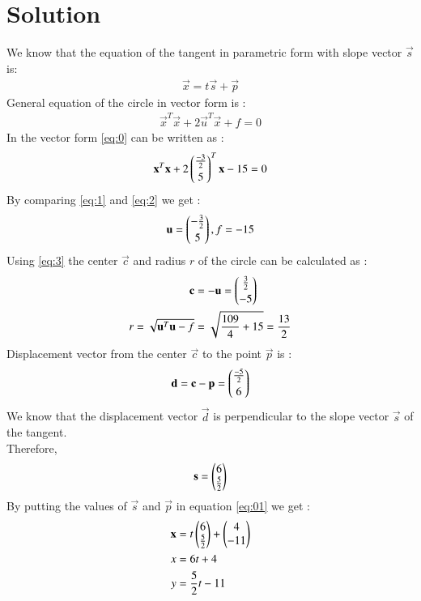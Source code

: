 \documentclass[journal,12pt,twocolumn]{IEEEtran}
\begin{document}
\section{\textbf{Solution}}
We know that the equation of the tangent in parametric form with slope vector $\vec{s}$ is:
\begin{align}
    \vec{x}=t\vec{s}+\vec{p}\label{eq:01}
\end{align}
General equation of the circle in vector form is :
\begin{align}
\vec{x}^T\vec{x}+2\vec{u}^T\vec{x}+f=0\label{eq:1}
\end{align}
In the vector form \eqref{eq:0} can be written as :
\begin{align}
\mathbf{x}^T\mathbf{x}+2\begin{pmatrix}\frac{-3}{2}\\[0.1 cm]5\end{pmatrix}^T\mathbf{x}-15=0\label{eq:2}
\end{align}
By comparing \eqref{eq:1} and \eqref{eq:2} we get : 
\begin{align}
    \mathbf{u}=\begin{pmatrix}-\frac{3}{2}\\[0.1 cm]5\end{pmatrix},f=-15\label{eq:3}
\end{align}
Using \eqref{eq:3} the center $\vec{c}$ and radius $r$ of the circle can be calculated as : 
\begin{align}
    \mathbf{c}&=-\mathbf{u}=\begin{pmatrix}\frac{3}{2}\\[0.1 cm]-5\end{pmatrix}\\
    r=\sqrt{\mathbf{u}^T\mathbf{u}-f}&=\sqrt{\frac{109}{4}+15}=\frac{13}{2}
\end{align}
Displacement vector from the center $\vec{c}$ to the point $\vec{p}$ is :
\begin{align}
    \mathbf{d}=\mathbf{c}-\mathbf{p}=\begin{pmatrix}\frac{-5}{2}\\[0.1cm]6\end{pmatrix}\label{eq:7}
\end{align}
We know that the displacement vector $\vec{d}$ is perpendicular to the slope vector $\vec{s}$ of the tangent.\\
Therefore,
\begin{align}
    \mathbf{s}=\begin{pmatrix}6\\\frac{5}{2}\end{pmatrix}
\end{align}
By putting the values of $\vec{s}$ and $\vec{p}$ in equation \eqref{eq:01} we get : 
\begin{align}
\mathbf{x}&=t\begin{pmatrix}6\\\frac{5}{2}\end{pmatrix}+\begin{pmatrix}4\\-11\end{pmatrix}\\
x&=6t+4\label{eq:10}\\
y&=\frac{5}{2}t-11\label{eq:11}
\end{align}
\end{document}
